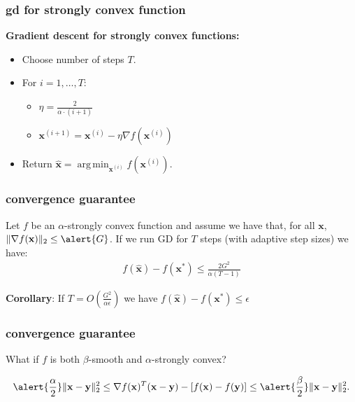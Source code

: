 \documentclass[compress]{beamer}
\newcommand{\bv}[1]{\mathbf{#1}}
\DeclareMathOperator*{\argmin}{arg\,min}
\begin{document}
\begin{frame}[t]
	\frametitle{gd for strongly convex function}
	\textbf{Gradient descent for strongly convex functions:}
	\begin{itemize}
		\item Choose number of steps $T$.
		\item For $i = 1,\ldots, T$:
		\begin{itemize}
			\item $\eta = \frac{2}{\alpha\cdot(i+1)}$
			\item $\bv{x}^{(i+1)} = \bv{x}^{(i)} - \eta \nabla f(\bv{x}^{(i)})$
		\end{itemize}
		\item Return $\hat{\bv{x}} = \argmin_{\bv{x}^{(i)}} f(\bv{x}^{(i)})$. 
	\end{itemize}
\end{frame}

\begin{frame}[t]
	\frametitle{convergence guarantee}
	\begin{theorem}
		Let $f$ be an \alert{$\alpha$}-strongly convex function and assume we have that, for all $\bv{x}$, $\|\nabla f(\bv{x})\|_2 \leq \alert{G}$. If we run GD for $T$ steps (with adaptive step sizes) we have:
		\begin{align*}
			f(\hat{\bv{x}}) - f(\bv{x}^*) \leq \frac{2G^2}{\alpha(T-1)} 
		\end{align*} 
	\end{theorem}
	\textbf{Corollary}: If \alert{$T = O\left(\frac{G^2}{\alpha \epsilon}\right)$} we have $f(\hat{\bv{x}}) - f(\bv{x}^*) \leq \epsilon$
\end{frame}

\begin{frame}[t]
	\frametitle{convergence guarantee}
		\begin{center}
		What if $f$ is both $\beta$-smooth and $\alpha$-strongly convex?
	\end{center}
	\begin{align*}
		\alert{\frac{\alpha}{2}}\|\bv{x} - \bv{y}\|_2^2 \leq \nabla f(\bv{x})^T(\bv{x} - \bv{y}) - \left[f(\bv{x}) - f(\bv{y})\right] \leq \alert{\frac{\beta}{2}}\|\bv{x} - \bv{y}\|_2^2.
	\end{align*}

\end{frame}
\end{document}
